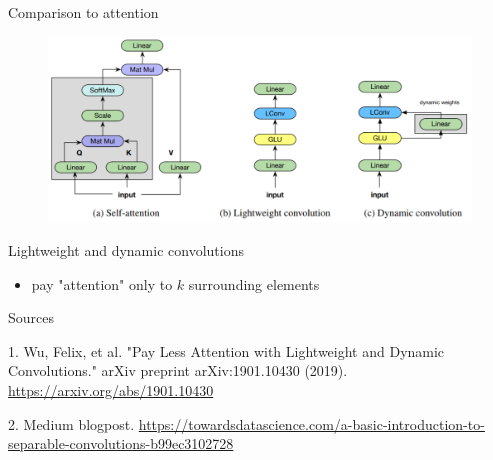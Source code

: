 \documentclass{beamer}
\begin{document}
\begin{frame}{Comparison to attention}

\begin{figure}[h]
\includegraphics[width=1.0\textwidth]{img/attention}
\end{figure}


Lightweight and dynamic  convolutions
\begin{itemize}
\item pay "attention" only to $k$ surrounding elements

\end{itemize}

\end{frame}




\begin{frame}{Sources}

\begin{thebibliography}{0}

   1. Wu, Felix, et al. "Pay Less Attention with Lightweight and Dynamic Convolutions." arXiv preprint arXiv:1901.10430 (2019). \url{https://arxiv.org/abs/1901.10430} 
  
   2. Medium blogpost. \url{https://towardsdatascience.com/a-basic-introduction-to-separable-convolutions-b99ec3102728}
  
\end{thebibliography}

\end{frame}

 
 
 
\end{document}
